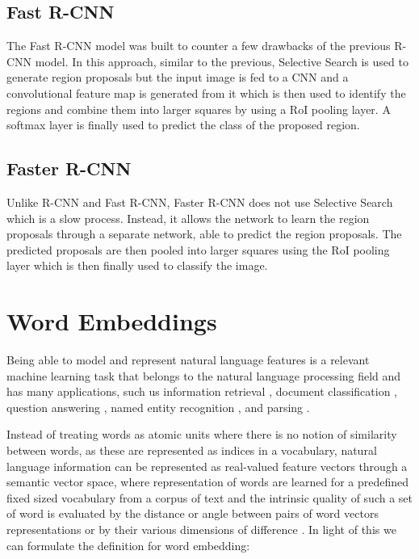 \subsection{Fast R-CNN}

The Fast R-CNN \cite{girshick2015fast} model was built to counter a
few drawbacks of the previous R-CNN model. In this approach, similar
to the previous, Selective Search is used to generate region proposals
but the input image is fed to a CNN and a convolutional feature map is
generated from it which is then used to identify the regions and
combine them into larger squares by using a RoI pooling layer. A
softmax layer is finally used to predict the class of the proposed
region.

\subsection{Faster R-CNN}
\label{subsec:faster-rcnn}

Unlike R-CNN and Fast R-CNN, Faster R-CNN \cite{ren2015faster} does
not use Selective Search which is a slow process. Instead, it allows
the network to learn the region proposals through a separate network,
able to predict the region proposals. The predicted proposals are then
pooled into larger squares using the RoI pooling layer which is then
finally used to classify the image.

\section{Word Embeddings}
\label{sec:word-embeddings}

Being able to model and represent natural language features is a
relevant machine learning task that belongs to the natural language
processing field and has many applications, such us information
retrieval \cite{sanderson2010christopher}, document classification
\cite{sebastiani2002machine}, question answering
\cite{tellex2003quantitative}, named entity recognition
\cite{turian2010word}, and parsing \cite{socher2013parsing}.

Instead of treating words as atomic units where there is no notion of
similarity between words, as these are represented as indices in a
vocabulary, natural language information can be represented as
real-valued feature vectors through a semantic vector space, where
representation of words are learned for a predefined fixed sized
vocabulary from a corpus of text and the intrinsic quality of such a
set of word is evaluated by the distance or angle between pairs of
word vectors representations or by their various dimensions of
difference \cite{mikolov2013linguistic}. In light of this we can
formulate the definition for word embedding: 


